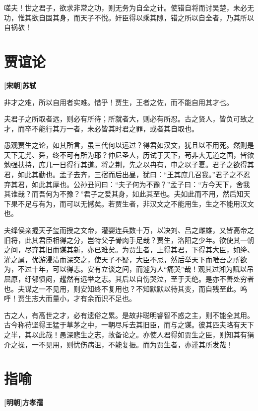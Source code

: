 \documentclass[UTF8,titlepage,oneside]{ctexbook}
\begin{document}
嗟夫！世之君子，欲求非常之功，则无务为自全之计。使错自将而讨吴楚，未必无功，惟其欲自固其身，而天子不悦。奸臣得以乘其隙，错之所以自全者，乃其所以自祸欤！



\chapter*{贾谊论}
\begin{center}
	\textbf{[宋朝]苏轼}
\end{center}

非才之难，所以自用者实难。惜乎！贾生，王者之佐，而不能自用其才也。


夫君子之所取者远，则必有所待；所就者大，则必有所忍。古之贤人，皆负可致之才，而卒不能行其万一者，未必皆其时君之罪，或者其自取也。


愚观贾生之论，如其所言，虽三代何以远过？得君如汉文，犹且以不用死。然则是天下无尧、舜，终不可有所为耶？仲尼圣人，历试于天下，苟非大无道之国，皆欲勉强扶持，庶几一日得行其道。将之荆，先之以冉有，申之以子夏。君子之欲得其君，如此其勤也。孟子去齐，三宿而后出昼，犹曰：“王其庶几召我。”君子之不忍弃其君，如此其厚也。公孙丑问曰：“夫子何为不豫？”孟子曰：“方今天下，舍我其谁哉？而吾何为不豫？”君子之爱其身，如此其至也。夫如此而不用，然后知天下果不足与有为，而可以无憾矣。若贾生者，非汉文之不能用生，生之不能用汉文也。


夫绛侯亲握天子玺而授之文帝，灌婴连兵数十万，以决刘、吕之雌雄，又皆高帝之旧将，此其君臣相得之分，岂特父子骨肉手足哉？贾生，洛阳之少年。欲使其一朝之间，尽弃其旧而谋其新，亦已难矣。为贾生者，上得其君，下得其大臣，如绛、灌之属，优游浸渍而深交之，使天子不疑，大臣不忌，然后举天下而唯吾之所欲为，不过十年，可以得志。安有立谈之间，而遽为人“痛哭”哉！观其过湘为赋以吊屈原，纡郁愤闷，趯然有远举之志。其后以自伤哭泣，至于夭绝。是亦不善处穷者也。夫谋之一不见用，则安知终不复用也？不知默默以待其变，而自残至此。呜呼！贾生志大而量小，才有余而识不足也。


古之人，有高世之才，必有遗俗之累。是故非聪明睿智不惑之主，则不能全其用。古今称苻坚得王猛于草茅之中，一朝尽斥去其旧臣，而与之谋。彼其匹夫略有天下之半，其以此哉！愚深悲生之志，故备论之。亦使人君得如贾生之臣，则知其有狷介之操，一不见用，则忧伤病沮，不能复振。而为贾生者，亦谨其所发哉！



\chapter*{指喻}
\begin{center}
	\textbf{[明朝]方孝孺}
\end{center}
\end{document}
